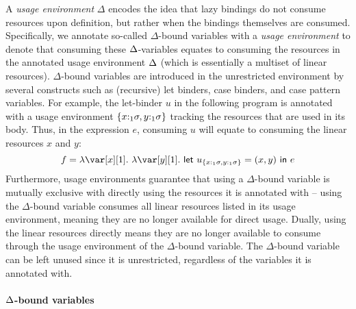\documentclass[acmsmall,review,anonymous,screen]{acmart}
\newcommand{\llet}[2]{\mathsf{let}~#1~\mathsf{in}~#2}
\begin{document}
A \emph{usage environment} $\Delta$ encodes the idea that lazy
bindings do not consume resources upon definition, but rather when the bindings themselves are consumed.
Specifically, we annotate so-called $\Delta$-bound variables with a \emph{usage
environment} to denote that consuming these $\Delta$-variables equates to consuming the
resources in the annotated usage environment $\Delta$ (which is essentially a
multiset of linear resources).
%
$\Delta$-bound variables are introduced in the unrestricted environment by
several constructs such as (recursive) let binders, case binders, and case
pattern variables.
%
For example, the let-binder $u$ in the following program is annotated with a
usage environment $\{x{:}_1\sigma,y{:}_1\sigma\}$ tracking the resources that are used in its
body. Thus, in the expression $e$, consuming $u$ will equate to consuming the
linear resources $x$ and $y$:
\[
f = \lambda \xl.~\lambda \y[1].~\llet{u_{\{x:_1\s,y:_1\s\}} = (x,y)}{e}
\]
Furthermore, usage environments guarantee that using a $\Delta$-bound variable
is mutually exclusive with directly using the resources it is annotated with --
using the $\Delta$-bound variable consumes all linear resources listed in its
usage environment, meaning they are no longer available for direct usage.
Dually, using the linear resources directly means they are no longer available
to consume through the usage environment of the $\Delta$-bound variable. The
$\Delta$-bound variable can be left unused since it is unrestricted, regardless
of the variables it is annotated with.

%
%

\paragraph{\texorpdfstring{$\Delta$}{Delta}-bound variables}
\end{document}
